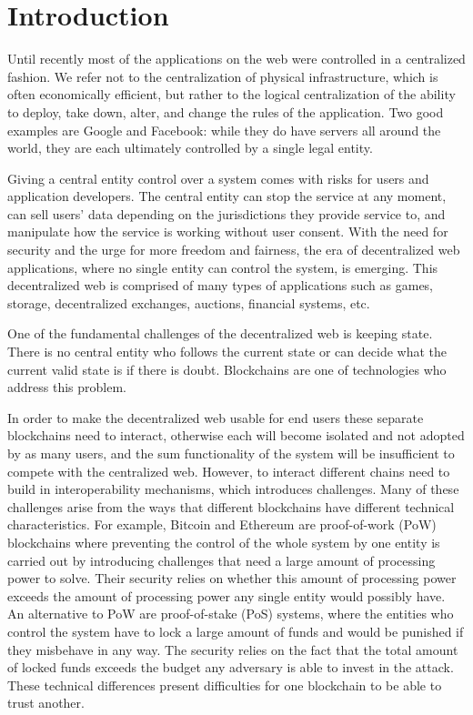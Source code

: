 \section{Introduction}\label{sec:intro}
Until recently most of the applications on the web were controlled in a centralized fashion.
We refer not to the centralization of physical infrastructure, which is often economically efficient, but rather to the logical centralization of the ability to deploy, take down, alter, and change the rules of the application.
Two good examples are Google and Facebook: while they do have servers all around the world, they are each ultimately controlled by a single legal entity.

Giving a central entity control over a system comes with risks for users and application developers.
The central entity can stop the service at any moment, can sell users' data depending on the jurisdictions they provide service to, and manipulate how the service is working without user consent.
With the need for security and the urge for more freedom and fairness, the era of decentralized web applications, where no single entity can control the system, is emerging.
This decentralized web is comprised of many types of applications such as games, storage, decentralized exchanges, auctions, financial systems, etc.

One of the fundamental challenges of the decentralized web is keeping state. There is no central entity who follows the current state or can decide what the current valid state is if there is doubt.
Blockchains are one of technologies who address this problem.

In order to make the decentralized web usable for end users these separate blockchains need to interact, otherwise each will become isolated and not adopted by as many users, and the sum functionality of the system will be insufficient to compete with the centralized web.
However, to interact different chains need to build in interoperability mechanisms, which introduces challenges. Many of these challenges arise from the ways that different blockchains have different technical characteristics. For example, Bitcoin and Ethereum are proof-of-work (PoW) blockchains where preventing the control of the whole system by one entity is carried out by introducing challenges that need a large amount of processing power to solve. Their security relies on whether this amount of processing power exceeds the amount of processing power any single entity would possibly have. An alternative to PoW are proof-of-stake (PoS) systems, where the entities who control the system have to lock a large amount of funds and would be punished if they misbehave in any way.
The security relies on the fact that the total amount of locked funds exceeds the budget any adversary is able to invest in the attack.
These technical differences present difficulties for one blockchain to be able to trust another.

